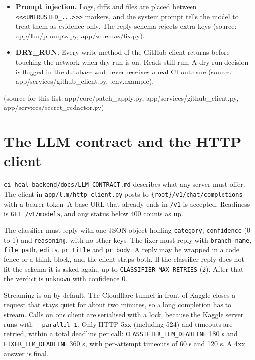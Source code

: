 \documentclass[11pt,a4paper]{report}
\begin{document}
\begin{itemize}[leftmargin=*,itemsep=2pt]
\item \textbf{Prompt injection.} Logs, diffs and files are placed between \texttt{\textless{}\textless{}\textless{}UNTRUSTED\_\allowbreak{}.\allowbreak{}.\allowbreak{}.\allowbreak{}\textgreater{}\textgreater{}\textgreater{}} markers, and the system prompt tells the model to treat them as evidence only. The reply schema rejects extra keys (source: app/llm/prompts.py, app/schemas/fix.py).
\item \textbf{DRY\_RUN.} Every write method of the GitHub client returns before touching the network when dry-run is on. Reads still run. A dry-run decision is flagged in the database and never receives a real CI outcome (source: app/services/github\_client.py, .env.example).
\end{itemize}

(source for this list: app/core/patch\_apply.py, app/services/github\_client.py, app/services/secret\_redactor.py)

\section{The LLM contract and the HTTP client}

\texttt{ci-\allowbreak{}heal-\allowbreak{}backend/\allowbreak{}docs/\allowbreak{}LLM\_\allowbreak{}CONTRACT.\allowbreak{}md} describes what any server must offer. The client in \texttt{app/\allowbreak{}llm/\allowbreak{}http\_\allowbreak{}client.\allowbreak{}py} posts to \texttt{\{root\}/\allowbreak{}v1/\allowbreak{}chat/\allowbreak{}completions} with a bearer token. A base URL that already ends in \texttt{/\allowbreak{}v1} is accepted. Readiness is \texttt{GET /\allowbreak{}v1/\allowbreak{}models}, and any status below 400 counts as up.

The classifier must reply with one JSON object holding \texttt{category}, \texttt{confidence} (0 to 1) and \texttt{reasoning}, with no other keys. The fixer must reply with \texttt{branch\_\allowbreak{}name}, \texttt{file\_\allowbreak{}path}, \texttt{edits}, \texttt{pr\_\allowbreak{}title} and \texttt{pr\_\allowbreak{}body}. A reply may be wrapped in a code fence or a think block, and the client strips both. If the classifier reply does not fit the schema it is asked again, up to \texttt{CLASSIFIER\_\allowbreak{}MAX\_\allowbreak{}RETRIES} (2). After that the verdict is \texttt{unknown} with confidence 0.

Streaming is on by default. The Cloudflare tunnel in front of Kaggle closes a request that stays quiet for about two minutes, so a long completion has to stream. Calls on one client are serialised with a lock, because the Kaggle server runs with \texttt{-\allowbreak{}-\allowbreak{}parallel 1}. Only HTTP 5xx (including 524) and timeouts are retried, within a total deadline per call: \texttt{CLASSIFIER\_\allowbreak{}LLM\_\allowbreak{}DEADLINE} 180 s and \texttt{FIXER\_\allowbreak{}LLM\_\allowbreak{}DEADLINE} 360 s, with per-attempt timeouts of 60 s and 120 s. A 4xx answer is final.
\end{document}
